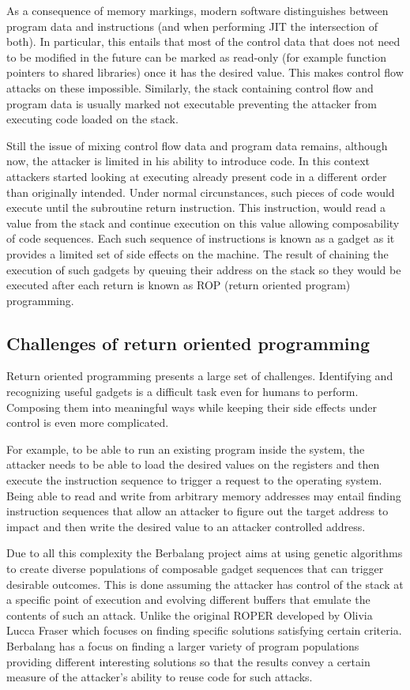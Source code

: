 \documentclass{article}
\begin{document}
As a consequence of memory markings, modern software distinguishes between program data and instructions (and when performing JIT the intersection of both). In particular, this  entails that most of the control data that does not need to be modified in the future can be marked as read-only (for example function pointers to shared libraries) once it has the desired value. This makes control flow attacks on these impossible. Similarly,
the stack containing control flow and program data is usually marked not executable preventing the attacker from executing code loaded on the stack.

Still the issue of mixing control flow data and program data remains, although now, the attacker is limited in his ability to introduce code. In this context attackers started looking at executing already present code in a different order than originally intended. Under normal circunstances, such pieces of code would execute until the subroutine return instruction. This instruction, would read a value from the stack and continue execution on this value allowing composability of code sequences. Each such sequence of instructions is known as a gadget as it provides a limited set of side effects on the machine. The result of chaining the execution of such gadgets by queuing their address on the stack so they would be executed after each return is known as ROP (return oriented program) programming.

\subsection{Challenges of return oriented programming}
Return oriented programming presents a large set of challenges. Identifying and recognizing useful gadgets is a difficult task even for humans to perform. Composing them into meaningful ways while keeping their side effects under control is even more complicated.

For example, to be able to run an existing program inside the system, the attacker needs to be able to load the desired values on the registers and then execute the instruction sequence to trigger a request to the operating system. Being able to read and write from arbitrary memory addresses may entail finding instruction sequences that allow an attacker to figure out the target address to impact and then write the desired value to an attacker controlled address.

Due to all this complexity the Berbalang project aims at using genetic algorithms to create diverse populations of composable gadget sequences that can trigger desirable outcomes. This is done assuming the attacker has control of the stack at a specific point of execution and evolving different buffers that emulate the contents of such an attack. Unlike the original ROPER developed by Olivia Lucca Fraser which focuses on finding specific solutions satisfying certain criteria. Berbalang has a focus on finding a larger variety of program populations providing different interesting solutions so that the results convey a certain measure of the attacker's ability to reuse code for such attacks.
\end{document}
